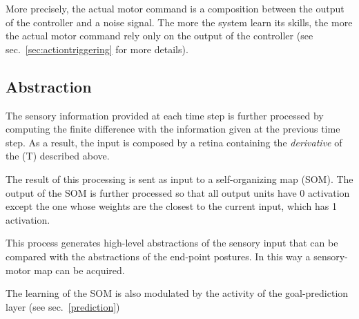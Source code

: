 \documentclass[11pt]{article}
\begin{document}
More precisely, the actual motor command is a composition
between the output of the controller and a noise signal. The
more the system learn its skills, the more the actual motor
command rely only on the output of the controller (see 
sec.~\ref{sec:actiontriggering} for more details).

\subsection{Abstraction}
\label{sec:abstraction}

The sensory information provided at each time step is
further processed by computing the finite difference with
the information given at the previous time step. As a
result, the input is composed by a retina containing the
\emph{derivative} of the (T) described above.

The result of this processing is sent as input to a
self-organizing map (SOM).  The output of the SOM is further
processed so that all output units have 0 activation except
the one whose weights are the closest to the current input,
which has 1 activation.  

This process generates high-level abstractions of the
sensory input that can be compared with the abstractions of
the end-point postures. In this way a sensory-motor map can
be acquired.

The learning of the SOM is also modulated by the activity of
the goal-prediction layer (see sec.~\ref{prediction})

%
%
%
%
\end{document}
